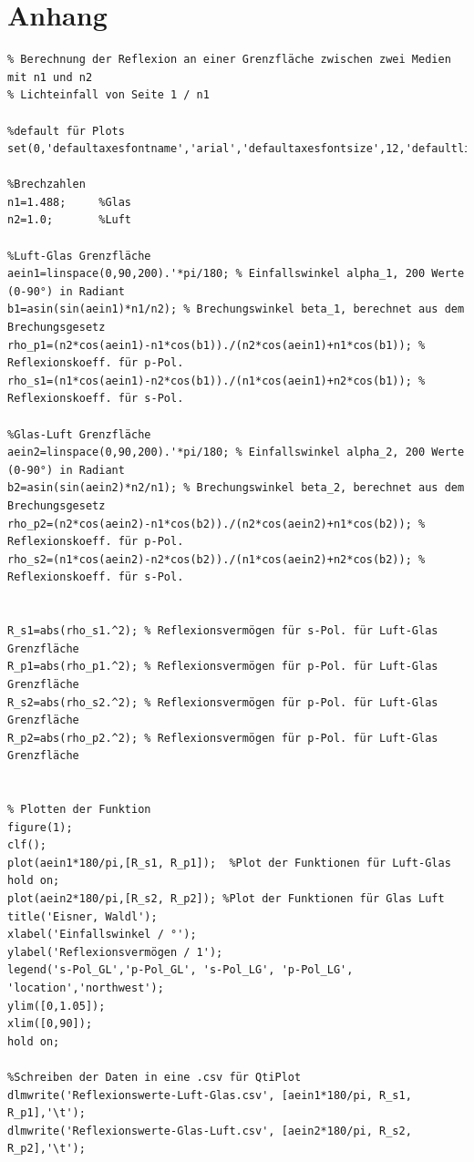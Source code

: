 \documentclass[12pt,a4paper,twoside]{article}
\begin{document}
\section{Anhang}

\begin{verbatim}
% Berechnung der Reflexion an einer Grenzfläche zwischen zwei Medien mit n1 und n2
% Lichteinfall von Seite 1 / n1

%default für Plots
set(0,'defaultaxesfontname','arial','defaultaxesfontsize',12,'defaultlinelinewidth',2);

%Brechzahlen
n1=1.488;     %Glas
n2=1.0;       %Luft             

%Luft-Glas Grenzfläche
aein1=linspace(0,90,200).'*pi/180; % Einfallswinkel alpha_1, 200 Werte (0-90°) in Radiant
b1=asin(sin(aein1)*n1/n2); % Brechungswinkel beta_1, berechnet aus dem Brechungsgesetz
rho_p1=(n2*cos(aein1)-n1*cos(b1))./(n2*cos(aein1)+n1*cos(b1)); % Reflexionskoeff. für p-Pol.
rho_s1=(n1*cos(aein1)-n2*cos(b1))./(n1*cos(aein1)+n2*cos(b1)); % Reflexionskoeff. für s-Pol.

%Glas-Luft Grenzfläche
aein2=linspace(0,90,200).'*pi/180; % Einfallswinkel alpha_2, 200 Werte (0-90°) in Radiant
b2=asin(sin(aein2)*n2/n1); % Brechungswinkel beta_2, berechnet aus dem Brechungsgesetz
rho_p2=(n2*cos(aein2)-n1*cos(b2))./(n2*cos(aein2)+n1*cos(b2)); % Reflexionskoeff. für p-Pol.
rho_s2=(n1*cos(aein2)-n2*cos(b2))./(n1*cos(aein2)+n2*cos(b2)); % Reflexionskoeff. für s-Pol.


R_s1=abs(rho_s1.^2); % Reflexionsvermögen für s-Pol. für Luft-Glas Grenzfläche
R_p1=abs(rho_p1.^2); % Reflexionsvermögen für p-Pol. für Luft-Glas Grenzfläche
R_s2=abs(rho_s2.^2); % Reflexionsvermögen für p-Pol. für Luft-Glas Grenzfläche
R_p2=abs(rho_p2.^2); % Reflexionsvermögen für p-Pol. für Luft-Glas Grenzfläche


% Plotten der Funktion
figure(1);
clf();
plot(aein1*180/pi,[R_s1, R_p1]);  %Plot der Funktionen für Luft-Glas
hold on;
plot(aein2*180/pi,[R_s2, R_p2]); %Plot der Funktionen für Glas Luft
title('Eisner, Waldl');
xlabel('Einfallswinkel / °');
ylabel('Reflexionsvermögen / 1');
legend('s-Pol_GL','p-Pol_GL', 's-Pol_LG', 'p-Pol_LG', 'location','northwest');
ylim([0,1.05]);
xlim([0,90]);
hold on;

%Schreiben der Daten in eine .csv für QtiPlot
dlmwrite('Reflexionswerte-Luft-Glas.csv', [aein1*180/pi, R_s1, R_p1],'\t');
dlmwrite('Reflexionswerte-Glas-Luft.csv', [aein2*180/pi, R_s2, R_p2],'\t');
\end{verbatim}

\printbibliography[heading=bibintoc]
\end{document}
